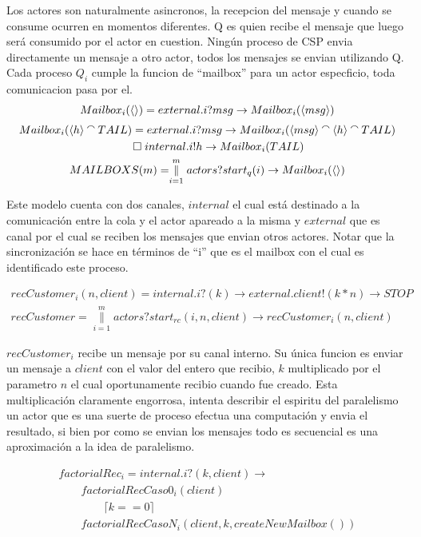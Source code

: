 \documentclass[fleqn]{article}
\newcommand{\myList}[1]{\langle #1 \rangle}
\newcommand{\myCons}[0]{\mathbin{\raise 0.8ex\hbox{$\smallfrown$}}}
\newcommand{\paralleln}[2]{\overset{#2}{\underset{i = #1}{\parallel}}}
\begin{document}
Los actores son naturalmente asincronos, la recepcion del mensaje y cuando se consume ocurren en momentos diferentes. Q es quien recibe el mensaje que luego será consumido por el actor en cuestion. Ningún proceso de CSP envia directamente un mensaje a otro actor, todos los mensajes se envian utilizando Q. Cada proceso $Q_i$ cumple la funcion de ``mailbox'' para un actor especficio, toda comunicacion pasa por el. \\

\begin{gather*}
Mailbox_i(\myList{}) = external.i?msg \rightarrow Mailbox_i(\myList{msg}) \\
Mailbox_i(\myList{h} \myCons TAIL) = external.i?msg \rightarrow Mailbox_i(\myList{msg} \myCons \myList{h} \myCons TAIL) \\ 
\qquad \square \; internal.i!h \rightarrow Mailbox_i(TAIL) \\  
MAILBOXS(m) = \paralleln{1}{m} actors?start_q(i) \rightarrow Mailbox_i(\myList{})
\end{gather*}

Este modelo cuenta con dos canales, $internal$ el cual está destinado a la comunicación entre la cola y el actor apareado a la misma y $external$ que es canal por el cual se reciben los mensajes que envian otros actores. Notar que la sincronización se hace en términos de ``i'' que es el mailbox con el cual es identificado este proceso.

\begin{gather*}
recCustomer_i(n, client) = internal.i?(k) \rightarrow external.client!(k*n) \rightarrow STOP \\
recCustomer = \paralleln{1}{m} actors?start_{rc}(i, n, client) \rightarrow recCustomer_i(n, client)
\end{gather*}

$recCustomer_i$ recibe un mensaje por su canal interno. Su única funcion es enviar un mensaje a $client$ con el valor del entero que recibio, $k$ multiplicado por el parametro $n$ el cual oportunamente recibio cuando fue creado. Esta multiplicación claramente engorrosa, intenta describir el espiritu del paralelismo un actor que es una suerte de proceso efectua una computación y envia el resultado, si bien por como se envian los mensajes todo es secuencial es una aproximación a la idea de paralelismo.

\begin{gather*} 
factorialRec_i = internal.i?(k,client) \rightarrow \\
\qquad factorialRecCaso0_i(client) \\
\qquad \qquad \lceil k == 0 \rceil \\
\qquad factorialRecCasoN_i(client, k, createNewMailbox())
\end{gather*}
\end{document}
